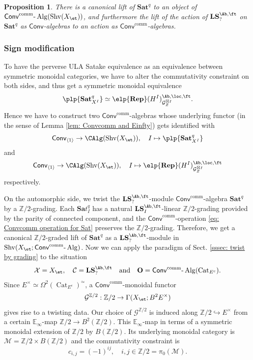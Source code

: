 \documentclass[10pt]{amsart}
\newcommand{\sssec}{\subsubsection}
\newtheorem{prop}[subsubsection]{Proposition}
\theoremstyle{remark}
\newcommand{\te}{\text}
\newcommand{\E}{\mathbb{E}}
\newcommand{\Z}{\mathbb{Z}}
\newcommand{\on}{\operatorname}
\newcommand{\cC}{\mathcal{C}}
\newcommand{\cG}{\mathcal{G}}
\newcommand{\cM}{\mathcal{M}}
\newcommand{\cX}{\mathcal{X}}
\newcommand{\Cat}{\on{Cat}}
\newcommand{\CatEc}{\Cat_{E^c}}
\newcommand{\lAlg}{\text{-}\on{Alg}}
\newcommand{\Shv}{\on{Shv}}
\newcommand{\bO}{\mathbf{O}}
\newcommand{\Conv}{\mathsf{Conv}}
\newcommand{\Convcomm}{\mathsf{Conv}^{\on{comm}}}
\begin{document}
    \begin{prop}
        There is a canonical lift of $\mathbf{Sat}^q$ to an object of $\Convcomm\lAlg(\Shv(X_{\et}))$, and furthermore the lift of the action of $\mathbf{LS}^{\Ab,\ft}_{?}$ on $\mathbf{Sat}^q$ as $\Conv$-algebras to an action as $\Convcomm$-algebras.
    \end{prop}

    \sssec{Sign modification}
    To have the perverse ULA Satake equivalence as an equivalence between symmetric monoidal categories, we have to alter the commutativity constraint on both sides, and thus get a symmetric monoidal equivalence
    \[\plp{\mathbf{Sat}^q_{X^I}}\simeq \elp{\textbf{Rep}}(H^I)^{\Ab,\loc,\ft}_{\cG^{\boxtimes I}_Z}.\]
    Hence we have to construct two $\Convcomm$-algebras whose underlying functor (in the sense of Lemma \ref{lem: Convcomm and Einfty}) gets identified with
    \begin{equation}\label{eq: underlying functor after alter}
        \Conv_{\langle 1\rangle}\rightarrow \CAlg(\Shv(X_{\et})),\quad I\mapsto \plp{\mathbf{Sat}^q_{X^I}}
    \end{equation}
    and
    \begin{equation}\label{eq: underlying functor B after alter}
        \Conv_{\langle 1\rangle}\rightarrow \CAlg(\Shv(X_{\et})),\quad I\mapsto \elp{\textbf{Rep}}(H^I)^{\Ab,\loc,\ft}_{\cG^{\boxtimes I}_Z}
    \end{equation}
    respectively.
    \medskip
    
    On the automorphic side, we twist the $\mathbf{LS}^{\Ab,\ft}_?$-module $\Convcomm$-algebra $\mathbf{Sat}^q$ by a $\Z/2$-grading. Each $\mathbf{Sa}t^q_{I}$ has a natural $\mathbf{LS}^{\Ab,\ft}_I$-linear $\Z/2$-grading provided by the parity of connected component, and the $\Convcomm$-operation \eqref{eq: Convcomm operation for Sat} preserves the $\Z/2$-grading. Therefore, we get a canonical $\Z/2$-graded lift of $\mathbf{Sat}^q$ as a $\mathbf{LS}^{\Ab,\ft}_?$-module in $\Shv(X_{\et};\Convcomm\lAlg)$. Now we can apply the paradigm of Sect. \ref{sssec: twist by grading} to the situation
    \[\cX=X_{\et},\quad \cC=\mathbf{LS}^{\Ab,\ft}_?\quad\te{and}\quad \bO=\Convcomm\lAlg(\CatEc).\]
    Since $E^{\times}\simeq \Omega^2(\CatEc)^{\simeq}$, a $\Convcomm$-monoidal functor
    \begin{equation}\label{eq: twisting data comm altering}
        \cG^{\Z/2}:\Z/2\rightarrow\Gamma(X_{\et}; B^2 E^{\times})
    \end{equation}
    gives rise to a twisting data. Our choice of $\cG^{\Z/2}$ is induced along $\Z/2\hookrightarrow E^{\times}$ from a certain $\E_{\infty}$-map $\Z/2\rightarrow B^2(\Z/2)$. This $\E_{\infty}$-map in terms of a symmetric monoidal extension of $\Z/2$ by $B(\Z/2)$. Its underlying monoidal category is $\cM=\Z/2\times B(\Z/2)$ and the commutativity constraint is 
    \[c_{i,j}=(-1)^{ij},\quad i,j\in \Z/2=\pi_0(\cM).\]
    
\end{document}
